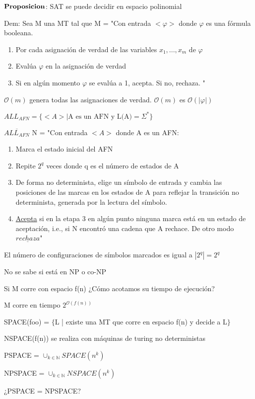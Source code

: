 \documentclass{homework}
\begin{document}
$\bf{Proposicion}$: SAT se puede decidir en espacio polinomial

Dem: Sea M una MT tal que 
M = "Con entrada $<\varphi>$ donde $\varphi$ es una fórmula booleana.
\begin{enumerate}
	\item Por cada asignación de verdad de las variables $x_1,...,x_m$ de $\varphi$
	\item Evalúa $\varphi$ en la asignación de verdad
	\item Si en algún momento $\varphi$ se evalúa a 1, acepta. Si no, rechaza. "
\end{enumerate}

$\mathcal{O}(m)$ genera todas las asignaciones de verdad.
$\mathcal{O}(m)$ es $\mathcal{O}(|\varphi|)$

$ALL_{AFN} = \{<A> | \text{A es un AFN y L(A)} = \Sigma^{*}\}$

$\overline{ALL_{AFN}}$
N = "Con entrada $<A>$ donde A es un AFN:
\begin{enumerate}
	\item Marca el estado inicial del AFN
	\item Repite $2^q$ veces donde q es el número de estados de A
	\item De forma no determinista, elige un símbolo de entrada y cambia las posiciones de las marcas en los estados de A para reflejar la transición no determinista, generada por la lectura del símbolo.
	\item \underline{Acepta} si en la etapa 3 en algún punto ninguna marca está en un estado de aceptación, i.e., si N encontró una cadena que A rechace. De otro modo $\underline{rechaza}$"
\end{enumerate}

El número de configuraciones de símbolos marcados es igual a $|2^q| = 2^q$

No se sabe si está en NP o co-NP

Si M corre con espacio f(n) ¿Cómo acotamos su tiempo de ejecución?

M corre en tiempo $2^{\mathcal{O}(f(n))}$

SPACE(foo) = $\{$L | existe una MT que corre en espacio f(n) y decide a L$\}$

NSPACE(f(n)) se realiza con máquinas de turing no deterministas

PSPACE = $\cup_{k \in \mathds{N}} SPACE(n^k)$

NPSPACE = $\cup_{k \in \mathds{N}} NSPACE(n^k)$

¿PSPACE = NPSPACE?
\end{document}
